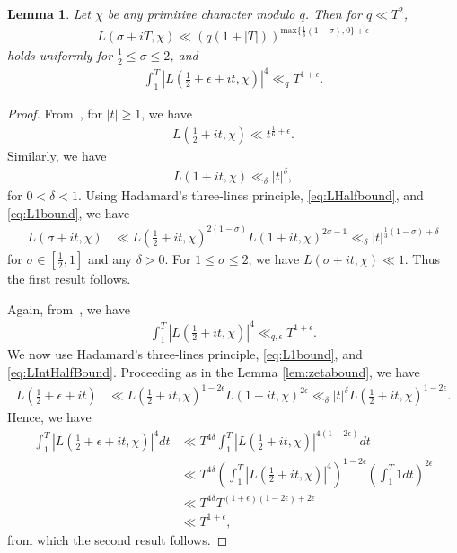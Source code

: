 \documentclass[10pt]{amsart}
\newtheorem{lemma}[theorem]{Lemma}
\begin{document}
\begin{lemma}\label{lem:LSigmaChi}
    Let $\chi$ be any primitive character modulo $q$. Then for $q \ll T^2$,
    \begin{align}
        L(\sigma+iT,\chi) \ll (q(1+|T|))^{\mathrm{max}\{\frac{1}{3}(1-\sigma),0\}+\epsilon}
    \end{align}
    holds uniformly for $\frac{1}{2} \leq \sigma \leq 2$, and 
    \begin{align}
        \int_{1}^{T}|L(\frac{1}{2}+\epsilon+it,\chi)|^4 \ll_{q} T^{1+\epsilon}.
    \end{align}
\end{lemma}
\begin{proof}
    From~\cite{Heath}, for $|t| \geq 1$, we have \begin{align} \label{eq:LHalfbound}
        L(\frac{1}{2}+it, \chi) \ll t^{\frac{1}{6}+\epsilon}.
    \end{align} 
    Similarly, we have
    \begin{align} \label{eq:L1bound}
        L(1+it, \chi) \ll_\delta |t|^{\delta},
    \end{align}
    for $0 < \delta < 1$. 
    Using Hadamard's three-lines principle, \eqref{eq:LHalfbound}, and \eqref{eq:L1bound}, we have \begin{align}
        L(\sigma+it,\chi) &\ll L(\frac{1}{2}+it,\chi)^{2(1-\sigma)}L(1+it, \chi)^{2\sigma-1} 
        \ll_\delta|t|^{\frac{1}{3}(1-\sigma)+\delta}
    \end{align}
  for $\sigma\in [\frac{1}{2},1]$ and any $\delta>0$.
    For $1 \leq \sigma \leq 2$, we have $L(\sigma+it, \chi) \ll  1$. Thus the first result follows.

    Again, from~\cite{Berke2021}, we have \begin{align} \label{eq:LIntHalfBound}
        \int_{1}^{T}\left |L\left(\frac{1}{2}+it,\chi \right) \right|^4 \ll_{q,\epsilon} T^{1+\epsilon}.
    \end{align}
     We now use Hadamard's three-lines principle, \eqref{eq:L1bound}, and \eqref{eq:LIntHalfBound}. Proceeding as in the Lemma \ref{lem:zetabound}, we have \begin{align}
        L(\frac{1}{2}+\epsilon+it) &\ll L\left( \frac{1}{2}+it, \chi \right)^{1-2\epsilon}L \left( 1+it, \chi \right)^{2\epsilon}        \ll_\delta |t|^{\delta}  L\left( \frac{1}{2}+it, \chi \right)^{1-2\epsilon}.
    \end{align}
    Hence, we have \begin{align}
        \int_{1}^{T} |L(\frac{1}{2}+\epsilon+it, \chi)|^{4}dt &\ll T^{4 \delta}\int_{1}^{T}\left|L\left( \frac{1}{2}+it, \chi \right)\right|^{4(1-2\epsilon)}dt \\
        &\ll T^{4\delta} \left( \int_{1}^{T}\left|L\left( \frac{1}{2}+it, \chi \right)\right|^4 \right)^{1-2\epsilon}\left( \int_{1}^{T}1 dt \right)^{2\epsilon} \\
        &\ll T^{4\delta}T^{(1+\epsilon)(1-2\epsilon)+2\epsilon} \\
        & \ll T^{1+\epsilon},
    \end{align}
    from which the second result follows.
    \end{proof}
\end{document}
